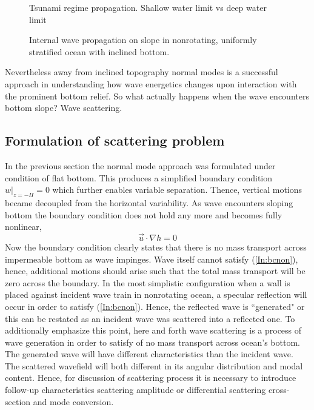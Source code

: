 \begin{figure}
\caption{Tsunami regime propagation. Shallow water limit vs deep water limit}
\end{figure}

\begin{figure}
\caption{Internal wave propagation on slope in nonrotating, uniformly stratified ocean with inclined bottom.}
\end{figure}
Nevertheless away from inclined topography normal modes is a successful approach in understanding how wave energetics changes upon interaction with the prominent bottom relief. So what actually happens when the wave encounters bottom slope? Wave scattering.

\subsection{Formulation of scattering problem}
In the previous section the normal mode approach was formulated under condition of flat bottom. This produces a simplified boundary condition $w|_{z = -H} = 0$ which further enables variable separation. Thence, vertical motions became decoupled from the horizontal variability. As wave encounters sloping bottom the boundary condition does not hold any more and becomes fully nonlinear,
\begin{equation}
\vec{u} \cdot \nabla h = 0 \label{In:bcnon}
\end{equation}
Now the boundary condition clearly states that there is no mass transport across impermeable bottom as wave impinges. Wave itself cannot satisfy (\ref{In:bcnon}), hence, additional motions should arise such that the total mass transport will be zero across the boundary. In the most simplistic configuration when a wall is placed against incident wave train in nonrotating ocean, a specular reflection will occur in order to satisfy (\ref{In:bcnon}). Hence, the reflected wave is ``generated" or this can be restated as an incident wave was scattered into a reflected one. To additionally emphasize this point, here and forth wave scattering is a process of wave generation in order to satisfy of no mass transport across ocean's bottom. The generated wave will have different characteristics than the incident wave. The scattered wavefield will both different in its angular distribution and modal content. Hence, for discussion of scattering process it is necessary to introduce follow-up characteristics scattering amplitude or differential scattering cross-section and mode conversion.\\
